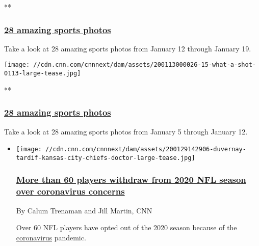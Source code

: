 **

\hypertarget{28-amazing-sports-photos}{%
\subsubsection{\texorpdfstring{\href{/2020/01/20/sport/gallery/what-a-shot-0120/index.html}{28
amazing sports
photos}}{28 amazing sports photos}}\label{28-amazing-sports-photos}}

Take a look at 28 amazing sports photos from January 12 through January
19.

\href{/2020/01/13/sport/gallery/what-a-shot-0113/index.html}{}

\texttt{[image: //cdn.cnn.com/cnnnext/dam/assets/200113000026-15-what-a-shot-0113-large-tease.jpg]}

**

\hypertarget{28-amazing-sports-photos-1}{%
\subsubsection{\texorpdfstring{\href{/2020/01/13/sport/gallery/what-a-shot-0113/index.html}{28
amazing sports
photos}}{28 amazing sports photos}}\label{28-amazing-sports-photos-1}}

Take a look at 28 amazing sports photos from January 5 through January
12.

\begin{itemize}
\item
  \href{/2020/08/07/sport/nfl-players-withdraw-2020-spt-intl/index.html}{}

  \texttt{[image: //cdn.cnn.com/cnnnext/dam/assets/200129142906-duvernay-tardif-kansas-city-chiefs-doctor-large-tease.jpg]}

  \hypertarget{more-than-60-players-withdraw-from-2020-nfl-season-over-coronavirus-concerns}{%
  \subsubsection{\texorpdfstring{\href{/2020/08/07/sport/nfl-players-withdraw-2020-spt-intl/index.html}{More
  than 60 players withdraw from 2020 NFL season over coronavirus
  concerns}}{More than 60 players withdraw from 2020 NFL season over coronavirus concerns}}\label{more-than-60-players-withdraw-from-2020-nfl-season-over-coronavirus-concerns}}

  By Calum Trenaman and Jill Martin, CNN

  Over 60 NFL players have opted out of the 2020 season because of the
  \href{https://www.cnn.com/2020/07/24/sport/chiefs-laurent-duvernay-tardif-opts-out-of-2020-nfl-season-spt-intl/index.html}{coronavirus}
  pandemic.
\end{itemize}

